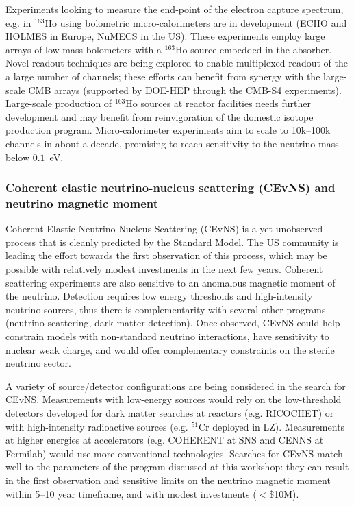 Experiments looking to measure the end-point of the electron capture
spectrum, e.g. in $^{163}$Ho using bolometric micro-calorimeters are
in development (ECHO and HOLMES in Europe, NuMECS in the US). These
experiments employ large arrays of low-mass bolometers with a
$^{163}$Ho source embedded in the absorber. Novel readout techniques
are being explored to enable multiplexed readout of the a large number
of channels; these efforts can benefit from synergy with the
large-scale CMB arrays (supported by DOE-HEP through the CMB-S4
experiments). Large-scale production of $^{163}$Ho sources at reactor
facilities needs further  development and may benefit from
reinvigoration of the domestic isotope production program. 
Micro-calorimeter experiments aim to scale to 10k--100k
channels in about a decade, promising to reach sensitivity to the
neutrino mass below $0.1$~eV.


\subsubsection{Coherent elastic neutrino-nucleus scattering (CEvNS)
  and neutrino magnetic moment}

Coherent Elastic Neutrino-Nucleus Scattering (CEvNS) is a yet-unobserved
process that is cleanly predicted by the Standard Model.  The US
community is leading the effort towards the first observation of this
process, which may be possible with relatively modest investments in
the next few years. Coherent scattering experiments are also
sensitive to an anomalous magnetic moment of the neutrino. Detection
requires low energy thresholds and high-intensity neutrino sources,
thus there is complementarity with several other programs (neutrino
scattering, dark matter detection). Once observed, CEvNS could help
constrain models with non-standard neutrino interactions, have
sensitivity to nuclear weak charge, and would offer complementary
constraints on the sterile neutrino sector. 

A variety of source/detector configurations are being considered in the
search for CEvNS. Measurements with low-energy sources would rely
on the low-threshold detectors developed for dark matter searches at
reactors (e.g. RICOCHET) or with high-intensity radioactive
sources (e.g. $^{51}$Cr deployed in LZ). Measurements at higher
energies at accelerators (e.g. COHERENT at SNS and CENNS at Fermilab)
would use more conventional technologies. Searches for CEvNS match
well to the parameters of the program discussed at this workshop: they
can result in the first observation and sensitive limits on the
neutrino magnetic moment within 5--10 year timeframe, and with modest
investments ($<$\$10M). 

